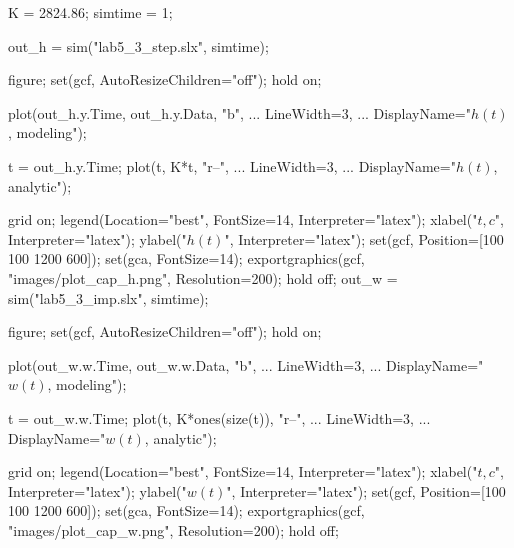\begin{matlabcode}
K = 2824.86;
simtime = 1;

out_h = sim("lab5_3_step.slx", simtime);

figure;
set(gcf, AutoResizeChildren="off");
hold on;

plot(out_h.y.Time, out_h.y.Data, "b", ...
     LineWidth=3, ...
     DisplayName="$h(t)$, modeling");

t = out_h.y.Time;
plot(t, K*t, "r--", ...
     LineWidth=3, ...
     DisplayName="$h(t)$, analytic");

grid on;
legend(Location="best", FontSize=14, Interpreter="latex");
xlabel("$t, c$", Interpreter="latex");
ylabel("$h(t)$", Interpreter="latex");
set(gcf, Position=[100 100 1200 600]);
set(gca, FontSize=14);
exportgraphics(gcf, "images/plot_cap_h.png", Resolution=200);
hold off;
out_w = sim("lab5_3_imp.slx", simtime);

figure;
set(gcf, AutoResizeChildren="off");
hold on;

plot(out_w.w.Time, out_w.w.Data, "b", ...
     LineWidth=3, ...
     DisplayName="$w(t)$, modeling");

t = out_w.w.Time;
plot(t, K*ones(size(t)), "r--", ...
     LineWidth=3, ...
     DisplayName="$w(t)$, analytic");

grid on;
legend(Location="best", FontSize=14, Interpreter="latex");
xlabel("$t, c$", Interpreter="latex");
ylabel("$w(t)$", Interpreter="latex");
set(gcf, Position=[100 100 1200 600]);
set(gca, FontSize=14);
exportgraphics(gcf, "images/plot_cap_w.png", Resolution=200);
hold off;
\end{matlabcode}



